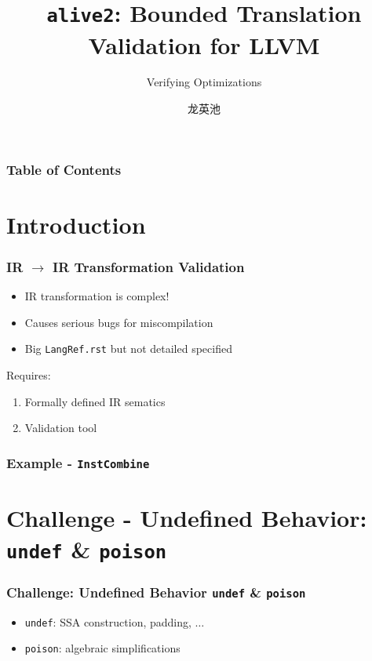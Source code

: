 \documentclass[aspectratio=169]{ctexbeamer}
\title{\texttt{alive2}: Bounded Translation Validation for LLVM\cite{lopes2021alive2}}
\subtitle{Verifying Optimizations}
\author{龙英池}
\institute{HIT}
\begin{document}
\maketitle
\begin{frame}
    \frametitle{Table of Contents}
    \tableofcontents
\end{frame}

\section{Introduction}
\begin{frame}
    \frametitle{IR $\rightarrow$ IR Transformation Validation}
    \begin{itemize}
        \item IR transformation is complex!
        \item Causes serious bugs for miscompilation
        \item Big \texttt{LangRef.rst} but not detailed specified
    \end{itemize}

    \vspace{2em}

    Requires:

    \begin{enumerate}
        \item Formally defined IR sematics
        \item Validation tool
    \end{enumerate}

\end{frame}

\begin{frame}
    \frametitle{Example - \texttt{InstCombine}}


\end{frame}


\section{Challenge - Undefined Behavior: \texttt{undef} \& \texttt{poison}}


\begin{frame}
    \frametitle{Challenge: Undefined Behavior \texttt{undef} \& \texttt{poison} ~\cite{lee_2020}}
    \begin{itemize}
        \item \texttt{undef}: SSA construction, padding, $\dots$
        \item \texttt{poison}: algebraic simplifications
    \end{itemize}
\end{frame}
\end{document}
